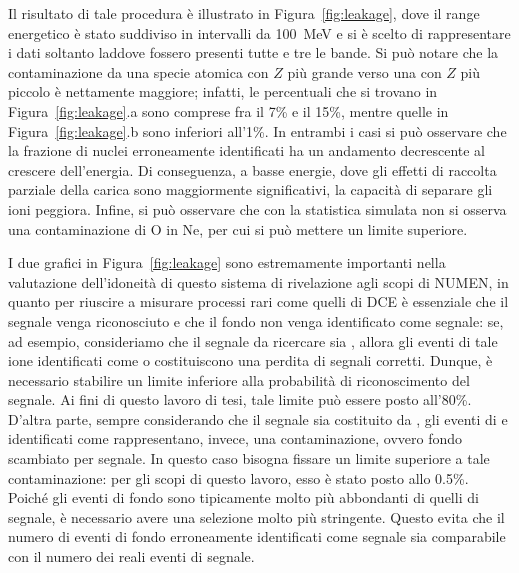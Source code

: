 Il risultato di tale procedura è illustrato in Figura~\ref{fig:leakage}, dove il range energetico è stato suddiviso in intervalli da 100~MeV e si è scelto di rappresentare i dati soltanto laddove fossero presenti tutte e tre le bande.
Si può notare che la contaminazione da una specie atomica con $Z$ più grande verso una con $Z$ più piccolo è nettamente maggiore; infatti, le percentuali che si trovano in Figura~\ref{fig:leakage}.a sono comprese fra il 7\% e il 15\%, mentre quelle in Figura~\ref{fig:leakage}.b sono inferiori all'1\%.
In entrambi i casi si può osservare che la frazione di nuclei erroneamente identificati ha un andamento decrescente al crescere dell'energia.
Di conseguenza, a basse energie, dove gli effetti di raccolta parziale della carica sono maggiormente significativi, la capacità di separare gli ioni peggiora.
Infine, si può osservare che con la statistica simulata non si osserva una contaminazione di O in Ne, per cui si può mettere un limite superiore.







I due grafici in Figura~\ref{fig:leakage} sono estremamente importanti nella valutazione dell'idoneità di questo sistema di rivelazione agli scopi di NUMEN, in quanto per riuscire a misurare processi rari come quelli di DCE è essenziale che il segnale venga riconosciuto e che il fondo non venga identificato come segnale: se, ad esempio, consideriamo che il segnale da ricercare sia , allora gli eventi di tale ione identificati come  o  costituiscono una perdita di segnali corretti. 
Dunque, è necessario stabilire un limite inferiore alla probabilità di riconoscimento del segnale.
Ai fini di questo lavoro di tesi, tale limite può essere posto all'80\%.
D'altra parte, sempre considerando che il segnale sia costituito da , gli eventi di  e  identificati come  rappresentano, invece, una contaminazione, ovvero fondo scambiato per segnale.
In questo caso bisogna fissare un limite superiore a tale contaminazione:
per gli scopi di questo lavoro, esso è stato posto allo 0.5\%.
Poiché gli eventi di fondo sono tipicamente molto più abbondanti di quelli di segnale, è necessario avere una selezione molto più stringente.
Questo evita che il numero di eventi di fondo erroneamente identificati come segnale sia comparabile con il numero dei reali eventi di segnale.







